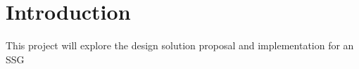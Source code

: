 

\chapter{Introduction}\label{ch:introduction}

This project will explore the design solution proposal and implementation for an
SSG~\cite{cloudflare}~\cite{hugo}~\cite{vuepress}~\cite{accwai}
